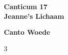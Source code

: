 \clearpage
\vspace*{\fill}
\begin{center}
\Huge \textbf{Canticum 17} \\
\vspace{0.5em}
\Huge \textbf{Jeanne’s Lichaam}

\end{center}
\vspace*{\fill}
\clearpage

\clearpage
\begin{center}
\Large \textbf{Canto Woede} \\
\vspace{0.5em}
\normalsize 
\end{center}

\vspace{1em}
\begin{multicols}{3}
\raggedright
{}
\end{multicols}

